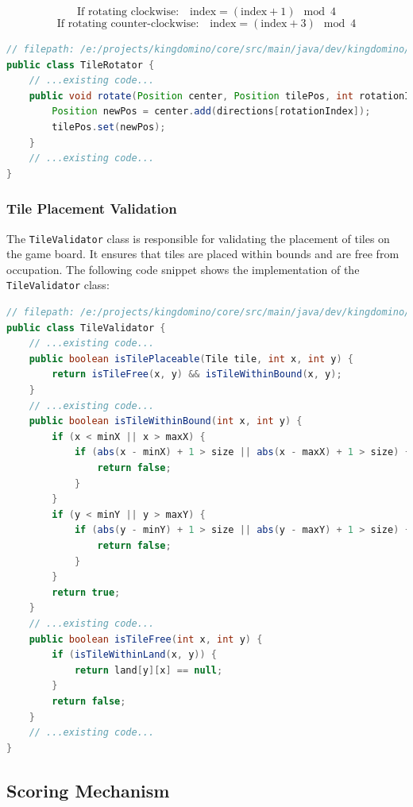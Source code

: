 \documentclass[conference]{IEEEtran}
\begin{document}
\[
    \text{If rotating clockwise:} \quad\boxed{\text{index} = (\text{index} + 1) \mod 4}
\]
\[
    \text{If rotating counter-clockwise:} \quad\boxed{\text{index} = (\text{index} + 3) \mod 4}
\]

\begin{lstlisting}[language=Java]
// filepath: /e:/projects/kingdomino/core/src/main/java/dev/kingdomino/game/TileRotator.java
public class TileRotator {
    // ...existing code...
    public void rotate(Position center, Position tilePos, int rotationIndex, boolean shouldOffset) {
        Position newPos = center.add(directions[rotationIndex]);
        tilePos.set(newPos);
    }
    // ...existing code...
}
\end{lstlisting}

\subsubsection{Tile Placement Validation}

The \texttt{TileValidator} class is responsible for validating the placement of
tiles on the game board. It ensures that tiles are placed within bounds and are
free from occupation. The following code snippet shows the implementation of
the \texttt{TileValidator} class:

\begin{lstlisting}[language=Java]
// filepath: /e:/projects/kingdomino/core/src/main/java/dev/kingdomino/game/TileValidator.java
public class TileValidator {
    // ...existing code...
    public boolean isTilePlaceable(Tile tile, int x, int y) {
        return isTileFree(x, y) && isTileWithinBound(x, y);
    }
    // ...existing code...
    public boolean isTileWithinBound(int x, int y) {
        if (x < minX || x > maxX) {
            if (abs(x - minX) + 1 > size || abs(x - maxX) + 1 > size) {
                return false;
            }
        }
        if (y < minY || y > maxY) {
            if (abs(y - minY) + 1 > size || abs(y - maxY) + 1 > size) {
                return false;
            }
        }
        return true;
    }
    // ...existing code...
    public boolean isTileFree(int x, int y) {
        if (isTileWithinLand(x, y)) {
            return land[y][x] == null;
        }
        return false;
    }
    // ...existing code...
}
\end{lstlisting}

\subsection{Scoring Mechanism}
\end{document}
